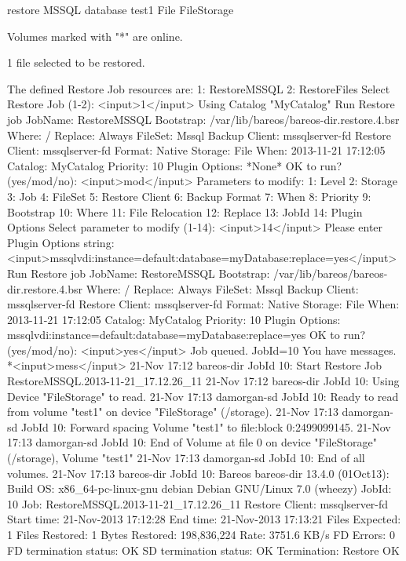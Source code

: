 \begin{bconsole}{restore MSSQL database}
    test1                     File                      FileStorage

Volumes marked with "*" are online.


1 file selected to be restored.

The defined Restore Job resources are:
     1: RestoreMSSQL
     2: RestoreFiles
Select Restore Job (1-2): <input>1</input>
Using Catalog "MyCatalog"
Run Restore job
JobName:         RestoreMSSQL
Bootstrap:       /var/lib/bareos/bareos-dir.restore.4.bsr
Where:           /
Replace:         Always
FileSet:         Mssql
Backup Client:   mssqlserver-fd
Restore Client:  mssqlserver-fd
Format:          Native
Storage:         File
When:            2013-11-21 17:12:05
Catalog:         MyCatalog
Priority:        10
Plugin Options:  *None*
OK to run? (yes/mod/no): <input>mod</input>
Parameters to modify:
     1: Level
     2: Storage
     3: Job
     4: FileSet
     5: Restore Client
     6: Backup Format
     7: When
     8: Priority
     9: Bootstrap
    10: Where
    11: File Relocation
    12: Replace
    13: JobId
    14: Plugin Options
Select parameter to modify (1-14): <input>14</input>
Please enter Plugin Options string: <input>mssqlvdi:instance=default:database=myDatabase:replace=yes</input>
Run Restore job
JobName:         RestoreMSSQL
Bootstrap:       /var/lib/bareos/bareos-dir.restore.4.bsr
Where:           /
Replace:         Always
FileSet:         Mssql
Backup Client:   mssqlserver-fd
Restore Client:  mssqlserver-fd
Format:          Native
Storage:         File
When:            2013-11-21 17:12:05
Catalog:         MyCatalog
Priority:        10
Plugin Options:  mssqlvdi:instance=default:database=myDatabase:replace=yes
OK to run? (yes/mod/no): <input>yes</input>
Job queued. JobId=10
You have messages.
*<input>mess</input>
21-Nov 17:12 bareos-dir JobId 10: Start Restore Job RestoreMSSQL.2013-11-21_17.12.26_11
21-Nov 17:12 bareos-dir JobId 10: Using Device "FileStorage" to read.
21-Nov 17:13 damorgan-sd JobId 10: Ready to read from volume "test1" on device "FileStorage" (/storage).
21-Nov 17:13 damorgan-sd JobId 10: Forward spacing Volume "test1" to file:block 0:2499099145.
21-Nov 17:13 damorgan-sd JobId 10: End of Volume at file 0 on device "FileStorage" (/storage), Volume "test1"
21-Nov 17:13 damorgan-sd JobId 10: End of all volumes.
21-Nov 17:13 bareos-dir JobId 10: Bareos bareos-dir 13.4.0 (01Oct13):
  Build OS:               x86_64-pc-linux-gnu debian Debian GNU/Linux 7.0 (wheezy)
  JobId:                  10
  Job:                    RestoreMSSQL.2013-11-21_17.12.26_11
  Restore Client:         mssqlserver-fd
  Start time:             21-Nov-2013 17:12:28
  End time:               21-Nov-2013 17:13:21
  Files Expected:         1
  Files Restored:         1
  Bytes Restored:         198,836,224
  Rate:                   3751.6 KB/s
  FD Errors:              0
  FD termination status:  OK
  SD termination status:  OK
  Termination:            Restore OK
\end{bconsole}

